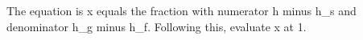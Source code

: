The equation is x equals the fraction with numerator h minus h_s and denominator h_g minus h_f. Following this, evaluate x at 1.
